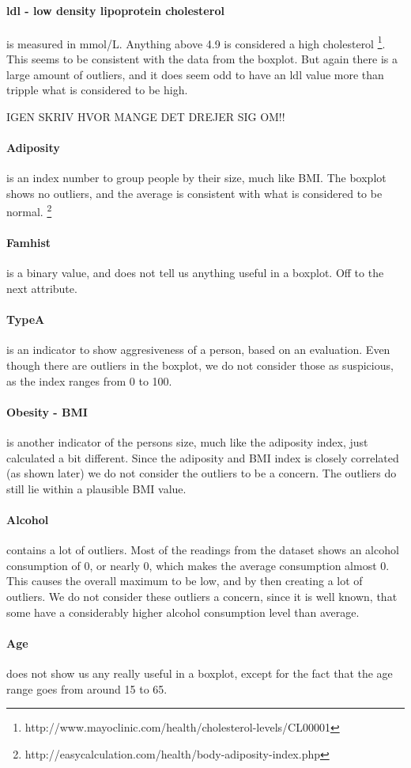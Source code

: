 \paragraph{ldl - low density lipoprotein cholesterol} is measured in mmol/L. Anything above 4.9 is considered a high cholesterol \footnote{http://www.mayoclinic.com/health/cholesterol-levels/CL00001}. This seems to be consistent with the data from the boxplot. But again there is a large amount of outliers, and it does seem odd to have an ldl value more than tripple what is considered to be high.

IGEN SKRIV HVOR MANGE DET DREJER SIG OM!!

\paragraph{Adiposity} is an index number to group people by their size, much like BMI. The boxplot shows no outliers, and the average is consistent with what is considered to be normal. \footnote{http://easycalculation.com/health/body-adiposity-index.php}

\paragraph{Famhist} is a binary value, and does not tell us anything useful in a boxplot. Off to the next attribute.

\paragraph{TypeA} is an indicator to show aggresiveness of a person, based on an evaluation. Even though there are outliers in the boxplot, we do not consider those as suspicious, as the index ranges from 0 to 100.

\paragraph{Obesity - BMI} is another indicator of the persons size, much like the adiposity index, just calculated a bit different. Since the adiposity and BMI index is closely correlated (as shown later) we do not consider the outliers to be a concern. The outliers do still lie within a plausible BMI value.

\paragraph{Alcohol} contains a lot of outliers. Most of the readings from the dataset shows an alcohol consumption of 0, or nearly 0, which makes the average consumption almost 0. This causes the overall maximum to be low, and by then creating a lot of outliers. We do not consider these outliers a concern, since it is well known, that some have a considerably higher alcohol consumption level than average.

\paragraph{Age} does not show us any really useful in a boxplot, except for the fact that the age range goes from around 15 to 65.

